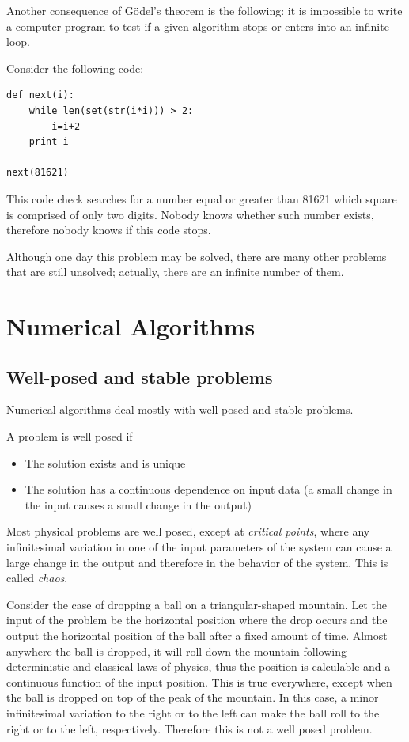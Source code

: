 \documentclass[justified,sixbynine]{tufte-book}
\theoremstyle{plain}%
\theoremstyle{definition}
\theoremstyle{remark}
\begin{document}
\begin{fullwidth}
Another consequence of G\"odel's theorem is the following:
it is impossible to write a computer program to test if a given algorithm
stops or enters into an infinite loop.

Consider the following code:

\begin{lstlisting}
def next(i):
    while len(set(str(i*i))) > 2:
        i=i+2
    print i

next(81621)
\end{lstlisting}

This code check searches for a number equal or greater than 81621 which square is comprised of only two digits. 
Nobody knows whether such number exists, therefore nobody knows if this code stops.

Although one day this problem may be solved, there are many other problems that
are still unsolved; actually, there are an infinite number of them.

\chapter{Numerical Algorithms}

\goodbreak\section{Well-posed and stable problems}


Numerical algorithms deal mostly with well-posed and stable problems.

A problem is well posed if
\begin{itemize}
\item The solution exists and is unique
\item The solution has a continuous dependence on input data (a small change in the input causes a small change in the output)
\end{itemize}


Most physical problems are well posed, except at {\it critical points}, where any infinitesimal variation in one of the input parameters of the system can cause a large change in the output and therefore in the behavior of the system. This is called {\it chaos}.

Consider the case of dropping a ball on a triangular-shaped mountain. Let the input of the problem be the horizontal position where the drop occurs and the output the horizontal position of the ball after a fixed amount of time. Almost anywhere the ball is dropped, it will roll down the mountain following deterministic and classical laws of physics, thus the position is calculable and a continuous function of the input position. This is true everywhere, except when the ball is dropped on top of the peak of the mountain. In this case, a minor infinitesimal variation to the right or to the left can make the ball roll to the right or to the left, respectively.  Therefore this is not a well posed problem.


\end{fullwidth}
\end{document}
